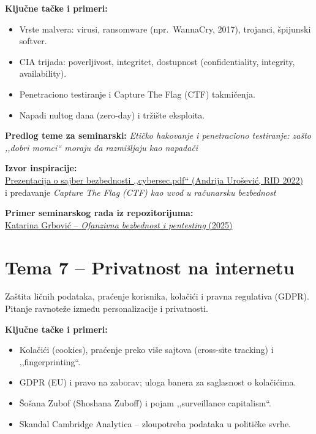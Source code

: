 \documentclass[12pt,a4paper]{article}
\begin{document}
\textbf{Ključne tačke i primeri:}
\begin{itemize}
    \item Vrste malvera: virusi, ransomware (npr.\ WannaCry, 2017), trojanci,
          špijunski softver.
    \item CIA trijada: poverljivost, integritet, dostupnost (confidentiality,
          integrity, availability).
    \item Penetraciono testiranje i Capture The Flag (CTF) takmičenja.
    \item Napadi nultog dana (zero-day) i tržište eksploita.
\end{itemize}

\textbf{Predlog teme za seminarski:}
\emph{Etičko hakovanje i penetraciono testiranje: zašto ,,dobri momci`` moraju da
razmišljaju kao napadači}

\textbf{Izvor inspiracije:}\\
\href{https://github.com/sanastojanovic/RID/blob/main/rid_2022_seminarski/mi18083_Andrija_Urosevic/predavanje_1/cybersec.pdf}%
{Prezentacija o sajber bezbednosti ,,cybersec.pdf`` (Andrija Urošević, RID 2022)}\\
i predavanje \emph{Capture The Flag (CTF) kao uvod u računarsku bezbednost}

\textbf{Primer seminarskog rada iz repozitorijuma:}\\
\href{https://github.com/sanastojanovic/RID/blob/main/rid_2025_seminarski/mi19257_Katarina_Grbovic/seminarski/pentesting.pdf}%
{Katarina Grbović -- \emph{Ofanzivna bezbednost i pentesting} (2025)}

\section{Tema 7 -- Privatnost na internetu}

Zaštita ličnih podataka, praćenje korisnika, kolačići i pravna regulativa (GDPR).
Pitanje ravnoteže između personalizacije i privatnosti.

\textbf{Ključne tačke i primeri:}
\begin{itemize}
    \item Kolačići (cookies), praćenje preko više sajtova (cross-site tracking) i
          ,,fingerprinting``.
    \item GDPR (EU) i pravo na zaborav; uloga banera za saglasnost o kolačićima.
    \item Šošana Zubof (Shoshana Zuboff) i pojam ,,surveillance capitalism``.
    \item Skandal Cambridge Analytica -- zloupotreba podataka u političke svrhe.
\end{itemize}
\end{document}
